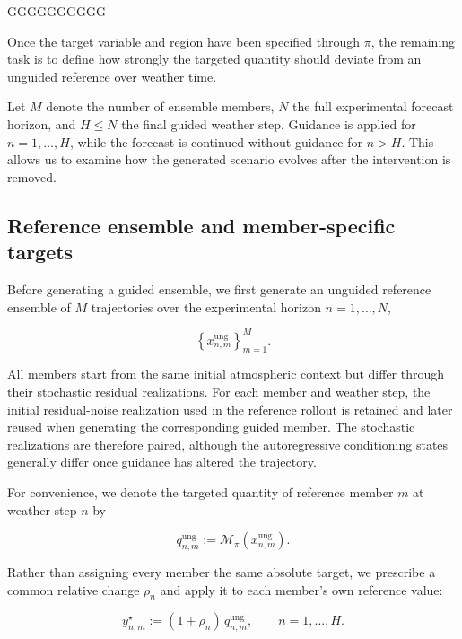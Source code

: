 GGGGGGGGGG

Once the target variable and region have been specified through $\pi$, the
remaining task is to define how strongly the targeted quantity should deviate
from an unguided reference over weather time.

Let $M$ denote the number of ensemble members, $N$ the full experimental
forecast horizon, and $H\leq N$ the final guided weather step. Guidance is
applied for $n=1,\ldots,H$, while the forecast is continued without guidance
for $n>H$. This allows us to examine how the generated scenario evolves after
the intervention is removed.


\subsection{Reference ensemble and member-specific targets}

Before generating a guided ensemble, we first generate an unguided reference
ensemble of $M$ trajectories over the experimental horizon $n=1,\ldots,N$,

\[
    \left\{
        x_{n,m}^{\mathrm{ung}}
    \right\}_{m=1}^{M}.
\]

All members start from the same initial atmospheric context but differ through
their stochastic residual realizations. For each member and weather step, the
initial residual-noise realization used in the reference rollout is retained
and later reused when generating the corresponding guided member. The
stochastic realizations are therefore paired, although the autoregressive
conditioning states generally differ once guidance has altered the trajectory.

For convenience, we denote the targeted quantity of reference member $m$ at
weather step $n$ by

\begin{equation}
    q_{n,m}^{\mathrm{ung}}
    :=
    \mathcal{M}_\pi
    \left(
        x_{n,m}^{\mathrm{ung}}
    \right).
    \label{eq:unguided-target-quantity}
\end{equation}

Rather than assigning every member the same absolute target, we prescribe a
common relative change $\rho_n$ and apply it to each member's own reference
value:

\begin{equation}
    y_{n,m}^\star
    :=
    (1+\rho_n)\,
    q_{n,m}^{\mathrm{ung}},
    \qquad
    n=1,\ldots,H.
    \label{eq:member-target}
\end{equation}

